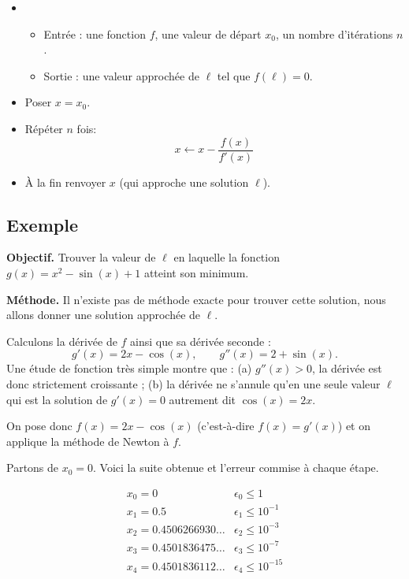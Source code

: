 \documentclass[11pt,class=report,crop=false]{standalone}
\begin{document}
 \begin{itemize}
   \item 
   \begin{itemize} 
       \item Entrée : une fonction $f$, une valeur de départ $x_0$, un nombre d'itérations $n$.
       \item Sortie : une valeur approchée de $\ell$ tel que $f(\ell)=0$.
     \end{itemize}
    
  \item Poser $x = x_0$.
  \item Répéter $n$ fois:
 $$x \leftarrow x - \dfrac{f(x)}{f'(x)}$$
        
   \item \`A la fin renvoyer $x$ (qui approche une solution $\ell$).
 \end{itemize}  
 
 
\subsection{Exemple}

\textbf{Objectif.} Trouver la valeur de $\ell$ en laquelle la fonction $g(x) = x^2-\sin(x)+1$ atteint son minimum.


\textbf{Méthode.} Il n'existe pas de méthode exacte pour trouver cette solution, nous allons donner une solution approchée de $\ell$.

Calculons la dérivée de $f$ ainsi que sa dérivée seconde : 
$$g'(x) = 2x-\cos(x), \qquad g''(x) = 2 + \sin(x).$$
Une étude de fonction très simple montre que : (a) $g''(x)>0$, la dérivée est donc strictement croissante ; (b) la dérivée ne s'annule qu'en une seule valeur $\ell$ qui est la solution de $g'(x)=0$ autrement dit $\cos(x)=2x$.

On pose donc $f(x) = 2x-\cos(x)$ (c'est-à-dire $f(x)=g'(x)$) et on applique la méthode de Newton à $f$.
 
Partons de $x_0 = 0$.
Voici la suite obtenue et l'erreur commise à chaque étape.

$$
\begin{array}{l|l}
  x_0 = 0                  	 & \epsilon_0 \le 1 \\
  x_1 = 0.5  				 & \epsilon_1 \le 10^{-1} \\
  x_2 = 0.4506266930\ldots   & \epsilon_2 \le 10^{-3} \\
  x_3 = 0.4501836475\ldots   & \epsilon_3 \le 10^{-7} \\
  x_4 = 0.4501836112\ldots   & \epsilon_4 \le 10^{-15} \\
\end{array}
$$
\end{document}
